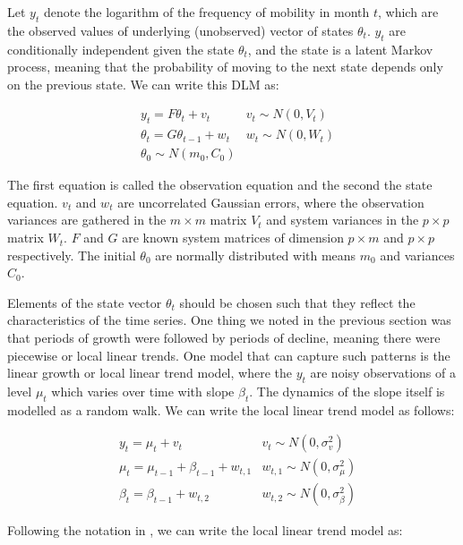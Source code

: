 \documentclass[12pt, a4paper]{article}
\begin{document}
Let $y_{t}$ denote the logarithm of the frequency of mobility in month
$t$, which are the observed values of underlying
(unobserved) vector of states $\theta_{t}$. $y_{t}$ are
conditionally independent given the state $\theta_{t}$, and the state
is a latent Markov process, meaning that the probability of
moving to the next state depends only on the previous state. We can
write this DLM as:

\begin{align}
& y_{t} = F \theta_{t} + v_{t} & v_{t} \sim N(0, V_{t}) \\
& \theta_{t} = G \theta_{t-1} + w_{t} &w_{t} \sim N(0, W_{t}) \\
& \theta_{0} \sim N(m_{0}, C_{0})
\end{align}


The first equation is called the observation equation and the
second the state equation. $v_{t}$ and $w_{t}$ are
uncorrelated Gaussian errors, where the observation variances are
gathered in the $m \times m$ matrix $V_{t}$ and system variances in
the $p \times p$ matrix $W_{t}$. $F$ and $G$ are known system
matrices of dimension $p \times m$ and $p \times p$ respectively.
The initial $\theta_{0}$ are normally distributed with means $m_{0}$
and variances $C_{0}$.

Elements of the state vector $\theta_{t}$ should be
chosen such that they reflect the characteristics of the time series. One thing we noted in the previous section was that periods of growth were followed by periods of decline, meaning there were piecewise or local linear trends. One model that can capture such patterns is the linear growth or local linear trend model, where the
$y_{t}$ are noisy observations of a level $\mu_{t}$ which varies
over time with slope $\beta_{t}$. The dynamics of the slope itself is
modelled as a random walk. We can write the local linear trend model as
follows:


\begin{align}
& y_{t} = \mu_{t} + v_{t} & v_{t} \sim N(0, \sigma_{v}^{2}) \\
& \mu_{t} = \mu_{t-1} + \beta_{t-1} + w_{t,1} &w_{t,1} \sim N(0, \sigma_{\mu}^{2}) \\
& \beta_{t} = \beta_{t-1} + w_{t,2} &w_{t,2} \sim N(0, \sigma_{\beta}^{2})
\end{align}


Following the notation in \citet{petris2009dynamic}, we can write the local
linear trend model as:
\end{document}
